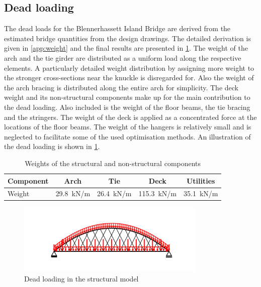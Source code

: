 \subsection{Dead loading}
The dead loads for the Blennerhassett Island Bridge are derived from the estimated bridge quantities from the design drawings. The detailed derivation is given in \cref{app:weight} and the final results are presented in \cref{tab:dead_loads}. The weight of the arch and the tie girder are distributed as a uniform load along the respective elements. A particularly detailed weight distribution by assigning more weight to the stronger cross-sections near the knuckle is disregarded for. Also the weight of the arch bracing is distributed along the entire arch for simplicity. The deck weight and its non-structural components make up for the main contribution to the dead loading. Also included is the weight of the floor beams, the tie bracing and the stringers. The weight of the deck is applied as a concentrated force at the locations of the floor beams. The weight of the hangers is relatively small and is neglected to facilitate some of the used optimisation methods. An illustration of the dead loading is shown in \cref{fig:dead_loads}.

\begin{table}[H]
    \centering
    \caption{Weights of the structural and non-structural components}
    \label{tab:dead_loads}
    \begin{tabular}{lcccc}
        \toprule
        Component & Arch & Tie & Deck & Utilities \\ \midrule
        Weight & \SI{29.8}{kN/m} & \SI{26.4}{kN/m} & \SI{115.3}{kN/m} & \SI{35.1}{kN/m} \\ \bottomrule
    \end{tabular}
\end{table}

\begin{figure}[H]
    \centering
    \includegraphics[trim={0 0.8cm 0 0.8cm},clip,
    width=0.8\textwidth]{illustrations/figures/permanent loads.png}
    \caption{Dead loading in the structural model}
    \label{fig:dead_loads}
\end{figure}

